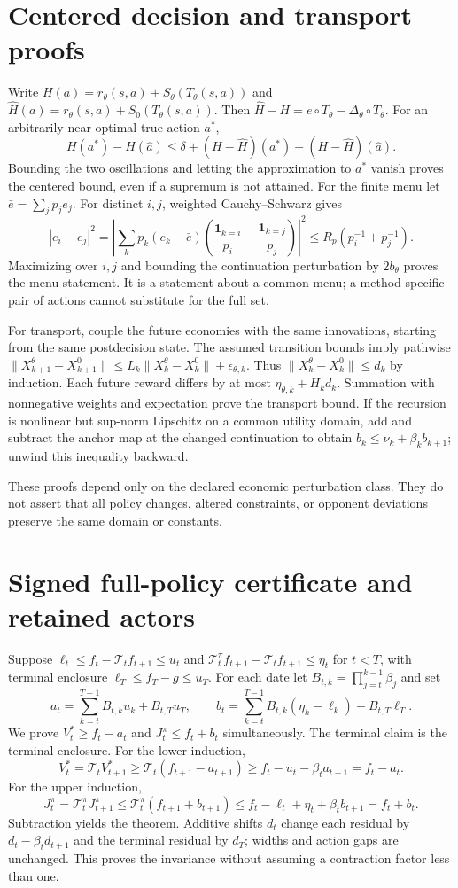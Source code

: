 \documentclass[ecta,nameyear,draft]{econsocart}
\begin{document}
\section{Centered decision and transport proofs}
Write $H(a)=r_\theta(s,a)+S_\theta(T_\theta(s,a))$ and
$\widehat H(a)=r_\theta(s,a)+\widehat S_0(T_\theta(s,a))$.
Then $\widehat H-H=e\circ T_\theta-\Delta_\theta\circ T_\theta$.
For an arbitrarily near-optimal true action $a^*$,
\[
 H(a^*)-H(\widehat a)
 \leq\delta+(H-\widehat H)(a^*)-(H-\widehat H)(\widehat a).
\]
Bounding the two oscillations and letting the approximation to $a^*$ vanish proves the centered bound, even if a supremum is not attained. For the finite menu let $\bar e=\sum_jp_je_j$. For distinct $i,j$, weighted Cauchy--Schwarz gives
\[
 |e_i-e_j|^2
 =\left|\sum_kp_k(e_k-\bar e)
       \left(\frac{\mathbf1_{k=i}}{p_i}-\frac{\mathbf1_{k=j}}{p_j}\right)\right|^2
 \leq R_p(p_i^{-1}+p_j^{-1}).
\]
Maximizing over $i,j$ and bounding the continuation perturbation by $2b_\theta$ proves the menu statement. It is a statement about a common menu; a method-specific pair of actions cannot substitute for the full set.

For transport, couple the future economies with the same innovations, starting from the same postdecision state. The assumed transition bounds imply pathwise
$\|X_{k+1}^\theta-X_{k+1}^0\|\leq L_k\|X_k^\theta-X_k^0\|+\epsilon_{\theta,k}$.
Thus $\|X_k^\theta-X_k^0\|\leq d_k$ by induction. Each future reward differs by at most $\eta_{\theta,k}+H_kd_k$. Summation with nonnegative weights and expectation prove the transport bound. If the recursion is nonlinear but sup-norm Lipschitz on a common utility domain, add and subtract the anchor map at the changed continuation to obtain $b_k\leq\nu_k+\beta_kb_{k+1}$; unwind this inequality backward.

These proofs depend only on the declared economic perturbation class. They do not assert that all policy changes, altered constraints, or opponent deviations preserve the same domain or constants.

\section{Signed full-policy certificate and retained actors}
Suppose $\ell_t\leq f_t-\mathcal T_tf_{t+1}\leq u_t$ and
$\mathcal T_t^\pi f_{t+1}-\mathcal T_tf_{t+1}\leq\eta_t$ for $t<T$, with terminal enclosure $\ell_T\leq f_T-g\leq u_T$.
For each date let $B_{t,k}=\prod_{j=t}^{k-1}\beta_j$ and set
\[
 a_t=\sum_{k=t}^{T-1}B_{t,k}u_k+B_{t,T}u_T,
 \qquad
 b_t=\sum_{k=t}^{T-1}B_{t,k}(\eta_k-\ell_k)-B_{t,T}\ell_T.
\]
We prove $V_t^*\geq f_t-a_t$ and $J_t^\pi\leq f_t+b_t$ simultaneously. The terminal claim is the terminal enclosure. For the lower induction,
\[
 V_t^*=\mathcal T_tV_{t+1}^*
 \geq\mathcal T_t(f_{t+1}-a_{t+1})
 \geq f_t-u_t-\beta_ta_{t+1}=f_t-a_t.
\]
For the upper induction,
\[
 J_t^\pi=\mathcal T_t^\pi J_{t+1}^\pi
 \leq\mathcal T_t^\pi(f_{t+1}+b_{t+1})
 \leq f_t-\ell_t+\eta_t+\beta_tb_{t+1}=f_t+b_t.
\]
Subtraction yields the theorem. Additive shifts $d_t$ change each residual by $d_t-\beta_td_{t+1}$ and the terminal residual by $d_T$; widths and action gaps are unchanged. This proves the invariance without assuming a contraction factor less than one.
\end{document}

